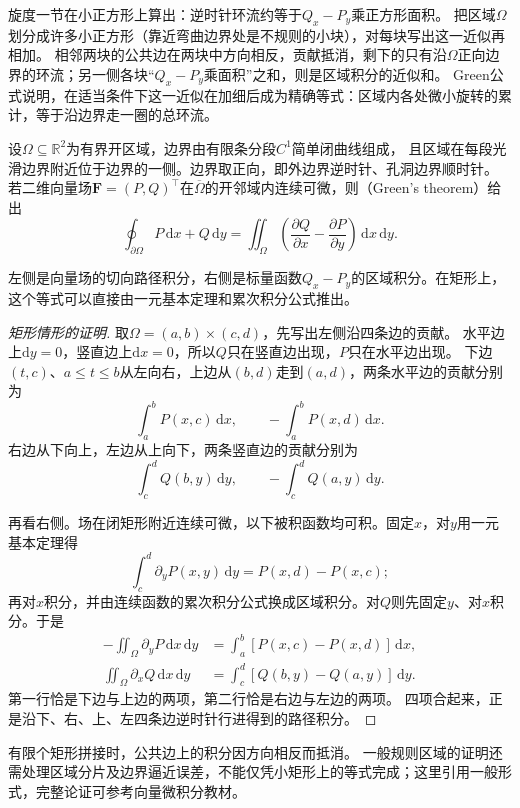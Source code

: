 旋度一节在小正方形上算出：逆时针环流约等于$Q_x-P_y$乘正方形面积。
把区域$\Omega$划分成许多小正方形（靠近弯曲边界处是不规则的小块），对每块写出这一近似再相加。
相邻两块的公共边在两块中方向相反，贡献抵消，剩下的只有沿$\Omega$正向边界的环流；另一侧各块“$Q_x-P_y$乘面积”之和，则是区域积分的近似和。
Green公式说明，在适当条件下这一近似在加细后成为精确等式：区域内各处微小旋转的累计，等于沿边界走一圈的总环流。
\begin{theorem}[Green公式]
\label{thm:multivariable-green}
设$\Omega\subseteq\mathbb R^2$为有界开区域，边界由有限条分段$C^1$简单闭曲线组成，
且区域在每段光滑边界附近位于边界的一侧。边界取正向，即外边界逆时针、孔洞边界顺时针。
若二维向量场$\bm F=(P,Q)^\top$在$\overline\Omega$的开邻域内连续可微，则（Green's theorem）给出
\begin{equation}
 \oint_{\partial\Omega}P\,\mathrm dx+Q\,\mathrm dy
 =\iint_\Omega\left(\frac{\partial Q}{\partial x}-\frac{\partial P}{\partial y}\right)\,\mathrm dx\,\mathrm dy.
 \label{eq:multivariable-green}
\end{equation}
\end{theorem}
左侧是向量场的切向路径积分，右侧是标量函数$Q_x-P_y$的区域积分。在矩形上，这个等式可以直接由一元基本定理和累次积分公式推出。
\begin{proof}[矩形情形的证明]
取$\Omega=(a,b)\times(c,d)$，先写出左侧沿四条边的贡献。
水平边上$\mathrm dy=0$，竖直边上$\mathrm dx=0$，所以$Q$只在竖直边出现，$P$只在水平边出现。
下边$(t,c)$、$a\leq t\leq b$从左向右，上边从$(b,d)$走到$(a,d)$，两条水平边的贡献分别为
\[
 \int_a^bP(x,c)\,\mathrm dx,\qquad -\int_a^bP(x,d)\,\mathrm dx.
\]
右边从下向上，左边从上向下，两条竖直边的贡献分别为
\[
 \int_c^dQ(b,y)\,\mathrm dy,\qquad -\int_c^dQ(a,y)\,\mathrm dy.
\]

再看右侧。场在闭矩形附近连续可微，以下被积函数均可积。固定$x$，对$y$用一元基本定理得
\[
 \int_c^d\partial_yP(x,y)\,\mathrm dy=P(x,d)-P(x,c);
\]
再对$x$积分，并由连续函数的累次积分公式换成区域积分。对$Q$则先固定$y$、对$x$积分。于是
\[
 \begin{aligned}
 -\iint_\Omega\partial_yP\,\mathrm dx\,\mathrm dy
 &=\int_a^b[P(x,c)-P(x,d)]\,\mathrm dx,\\
 \iint_\Omega\partial_xQ\,\mathrm dx\,\mathrm dy
 &=\int_c^d[Q(b,y)-Q(a,y)]\,\mathrm dy.
 \end{aligned}
\]
第一行恰是下边与上边的两项，第二行恰是右边与左边的两项。
四项合起来，正是沿下、右、上、左四条边逆时针行进得到的路径积分。
\end{proof}
有限个矩形拼接时，公共边上的积分因方向相反而抵消。
一般规则区域的证明还需处理区域分片及边界逼近误差，不能仅凭小矩形上的等式完成；这里引用一般形式，完整论证可参考向量微积分教材。

